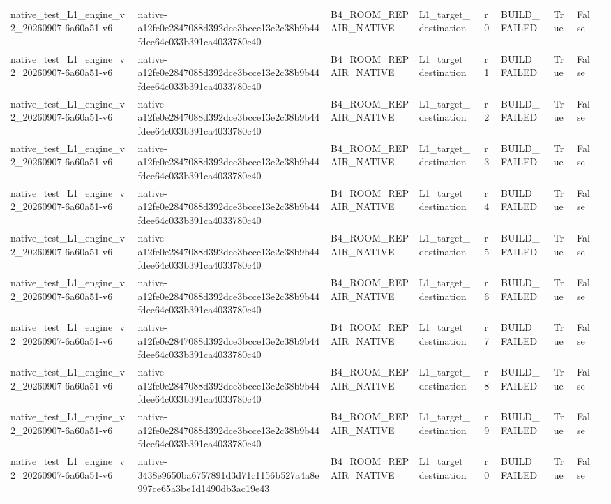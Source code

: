 \begin{tabular}{lllllllll}
native\_test\_L1\_engine\_v2\_20260907-6a60a51-v6 & native-a12fe0e2847088d392dce3bcce13e2c38b9b44fdee64c033b391ca4033780c40 & B4\_ROOM\_REPAIR\_NATIVE & L1\_target\_destination & r0 & BUILD\_FAILED & True & False &  \\
native\_test\_L1\_engine\_v2\_20260907-6a60a51-v6 & native-a12fe0e2847088d392dce3bcce13e2c38b9b44fdee64c033b391ca4033780c40 & B4\_ROOM\_REPAIR\_NATIVE & L1\_target\_destination & r1 & BUILD\_FAILED & True & False &  \\
native\_test\_L1\_engine\_v2\_20260907-6a60a51-v6 & native-a12fe0e2847088d392dce3bcce13e2c38b9b44fdee64c033b391ca4033780c40 & B4\_ROOM\_REPAIR\_NATIVE & L1\_target\_destination & r2 & BUILD\_FAILED & True & False &  \\
native\_test\_L1\_engine\_v2\_20260907-6a60a51-v6 & native-a12fe0e2847088d392dce3bcce13e2c38b9b44fdee64c033b391ca4033780c40 & B4\_ROOM\_REPAIR\_NATIVE & L1\_target\_destination & r3 & BUILD\_FAILED & True & False &  \\
native\_test\_L1\_engine\_v2\_20260907-6a60a51-v6 & native-a12fe0e2847088d392dce3bcce13e2c38b9b44fdee64c033b391ca4033780c40 & B4\_ROOM\_REPAIR\_NATIVE & L1\_target\_destination & r4 & BUILD\_FAILED & True & False &  \\
native\_test\_L1\_engine\_v2\_20260907-6a60a51-v6 & native-a12fe0e2847088d392dce3bcce13e2c38b9b44fdee64c033b391ca4033780c40 & B4\_ROOM\_REPAIR\_NATIVE & L1\_target\_destination & r5 & BUILD\_FAILED & True & False &  \\
native\_test\_L1\_engine\_v2\_20260907-6a60a51-v6 & native-a12fe0e2847088d392dce3bcce13e2c38b9b44fdee64c033b391ca4033780c40 & B4\_ROOM\_REPAIR\_NATIVE & L1\_target\_destination & r6 & BUILD\_FAILED & True & False &  \\
native\_test\_L1\_engine\_v2\_20260907-6a60a51-v6 & native-a12fe0e2847088d392dce3bcce13e2c38b9b44fdee64c033b391ca4033780c40 & B4\_ROOM\_REPAIR\_NATIVE & L1\_target\_destination & r7 & BUILD\_FAILED & True & False &  \\
native\_test\_L1\_engine\_v2\_20260907-6a60a51-v6 & native-a12fe0e2847088d392dce3bcce13e2c38b9b44fdee64c033b391ca4033780c40 & B4\_ROOM\_REPAIR\_NATIVE & L1\_target\_destination & r8 & BUILD\_FAILED & True & False &  \\
native\_test\_L1\_engine\_v2\_20260907-6a60a51-v6 & native-a12fe0e2847088d392dce3bcce13e2c38b9b44fdee64c033b391ca4033780c40 & B4\_ROOM\_REPAIR\_NATIVE & L1\_target\_destination & r9 & BUILD\_FAILED & True & False &  \\
native\_test\_L1\_engine\_v2\_20260907-6a60a51-v6 & native-3438e9650ba6757891d3d71c1156b527a4a8e997ce65a3be1d1490db3ac19e43 & B4\_ROOM\_REPAIR\_NATIVE & L1\_target\_destination & r0 & BUILD\_FAILED & True & False &  \\

\end{tabular}
